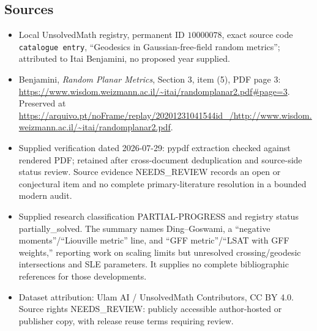 \documentclass[11pt]{article}
\begin{document}
\subsection{Sources}
\begin{itemize}
\item Local UnsolvedMath registry, permanent ID \(10000078\), exact source code \texttt{catalogue entry}, ``Geodesics in Gaussian-free-field random metrics''; attributed to Itai Benjamini, no proposed year supplied.
\item Benjamini, \emph{Random Planar Metrics}, Section 3, item (5), PDF page 3: \url{https://www.wisdom.weizmann.ac.il/~itai/randomplanar2.pdf#page=3}. Preserved at \url{https://arquivo.pt/noFrame/replay/20201231041544id_/http://www.wisdom.weizmann.ac.il/~itai/randomplanar2.pdf}.
\item Supplied verification dated 2026-07-29: pypdf extraction checked against rendered PDF; retained after cross-document deduplication and source-side status review. Source evidence NEEDS\_REVIEW records an open or conjectural item and no complete primary-literature resolution in a bounded modern audit.
\item Supplied research classification PARTIAL-PROGRESS and registry status partially\_solved. The summary names Ding--Goswami, a ``negative moments''/``Liouville metric'' line, and ``GFF metric''/``LSAT with GFF weights,'' reporting work on scaling limits but unresolved crossing/geodesic intersections and SLE parameters. It supplies no complete bibliographic references for those developments.
\item Dataset attribution: Ulam AI / UnsolvedMath Contributors, CC BY 4.0. Source rights NEEDS\_REVIEW: publicly accessible author-hosted or publisher copy, with release reuse terms requiring review.
\end{itemize}
\end{document}
